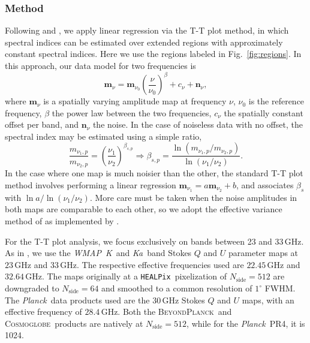 \documentclass[twocolumn]{../../common/aa}
\def\WMAP{\emph{WMAP}}
\def\Planck{\emph{Planck}}
\def\healpix{\texttt{HEALPix}}
\newcommand{\bp}{\textsc{BeyondPlanck}}
\newcommand{\cosmoglobe}{\textsc{Cosmoglobe}}
\newcommand{\K}[0]{\textit K}
\newcommand{\Ka}[0]{\textit{Ka}}
\begin{document}
\subsubsection{Method}
\label{sec:tt_plot_method}

Following \citet{fuskeland2014} and \citet{fuskeland:2019}, we apply linear regression via the T-T plot method, in which spectral indices can be estimated over extended regions with approximately constant spectral indices. Here we use the regions labeled in Fig.~\ref{fig:regions}. In this approach, our data model for two frequencies is
\begin{equation}
	\boldsymbol m_\nu = \boldsymbol m_{\nu_0}\left(\frac\nu{\nu_0}\right)^\beta+c_\nu+\boldsymbol n_\nu ,
\end{equation}
where $\boldsymbol m_\nu$ is a spatially varying amplitude map at frequency $\nu$, $\nu_0$ is the reference frequency, $\beta$ the power law between the two frequencies, $c_\nu$ the spatially constant offset per band, and $\boldsymbol n_\nu$ the noise.  In the case of noiseless data with no offset, the spectral index may be estimated using a simple ratio,
\begin{equation}
	\frac{m_{\nu_1,p}}{m_{\nu_2,p}}
	=\left(\frac{\nu_1}{\nu_2}\right)^{\beta_{s,p}}
	\Rightarrow
	\beta_{s,p}=\frac{\ln(m_{\nu_1,p}/m_{\nu_2,p})}{\ln(\nu_1/\nu_2)}.
\end{equation}
In the case where one map is much noisier than the other, the standard T-T plot method involves performing  a linear regression $\boldsymbol m_{\nu_1}=a\boldsymbol m_{\nu_2}+b$, and associates $\beta_s$ with $\ln a/\ln(\nu_1/\nu_2)$. More care must be taken when the noise amplitudes in both maps are comparable to each other, so we adopt the effective variance method of \citet{orear1982} as implemented by \citet{fuskeland2014}.

For the T-T plot  analysis, we focus exclusively on bands between 23 and 33\,GHz. As in \citet{fuskeland2014}, we use the \WMAP\ \K\ and \Ka\ band Stokes $Q$ and $U$ parameter maps at $23$\,GHz and $33$\,GHz. The respective effective frequencies used are $22.45$\,GHz and $32.64$\,GHz. The maps originally at a \healpix\ pixelization of $N_\textrm{side}=512$ are downgraded to $N_\textrm{side}=64$ and smoothed to a common resolution of $1^\circ$ FWHM.
The \Planck\ data products used are the $30$\,GHz Stokes $Q$ and $U$ maps, with an effective frequency of $28.4$\,GHz. Both the \bp\ and \cosmoglobe\ products are natively at $N_\textrm{side}=512$, while for the \Planck\ PR4, it is 1024.
\end{document}
